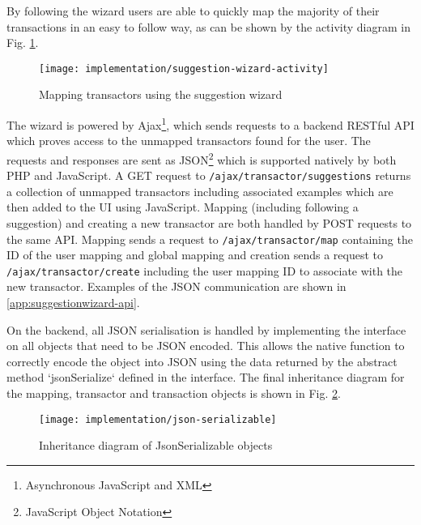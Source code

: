 By following the wizard users are able to quickly map the majority of their transactions in an easy to follow way, as can be shown by the activity diagram in Fig. \ref{fig:suggestion-wizard-activity}.

\begin{figure}[h]
    \centering
    \texttt{[image: implementation/suggestion-wizard-activity]}
    \caption{Mapping transactors using the suggestion wizard}
    \label{fig:suggestion-wizard-activity}
    
    \begin{comment}
(start)->(Map Transactor)-><a>->(end)
<a>->(Map Transactor)
    \end{comment}
\end{figure}

The wizard is powered by Ajax\footnote{Asynchronous JavaScript and XML}, which sends requests to a backend RESTful API which proves access to the unmapped transactors found for the user. The requests and responses are sent as JSON\footnote{JavaScript Object Notation} which is supported natively by both PHP and JavaScript. A GET request to \lstinline{/ajax/transactor/suggestions} returns a collection of unmapped transactors including associated examples which are then added to the UI using JavaScript.
%
Mapping (including following a suggestion) and creating a new transactor are both handled by POST requests to the same API. Mapping sends a request to \lstinline{/ajax/transactor/map} containing the ID of the user mapping and global mapping  and creation sends a request to \lstinline{/ajax/transactor/create} including the user mapping ID to associate with the new transactor. 
%
Examples of the JSON communication are shown in \autoref{app:suggestionwizard-api}.

On the backend, all JSON serialisation is handled by implementing the  interface on all objects that need to be JSON encoded. This allows the native function  to correctly encode the object into JSON using the data returned by the abstract method `jsonSerialize` defined in the interface. The final inheritance diagram for the mapping, transactor and transaction objects is shown in Fig. \ref{fig:mapping-inheritance-diagram}.

\begin{figure}[h]
    \centering
    \texttt{[image: implementation/json-serializable]}
    \caption{Inheritance diagram of JsonSerializable objects}
    \label{fig:mapping-inheritance-diagram}
    
    \begin{comment}
[<<Interface>> JsonSerializable]^-[<<Abstract>> Transactor]
[<<Interface>> JsonSerializable]^-[<<Abstract>> TransactorMapping]
[<<Interface>> JsonSerializable]^-[Transaction]
[<<Abstract>> TransactorMapping]^-[UserTransactorMapping]
[<<Abstract>> TransactorMapping]^-[GlobalTransactorMapping]
[<<Abstract>> Transactor]^-[UserTransactor]
[<<Abstract>> Transactor]^-[GlobalTransactor]
    \end{comment}
\end{figure}

